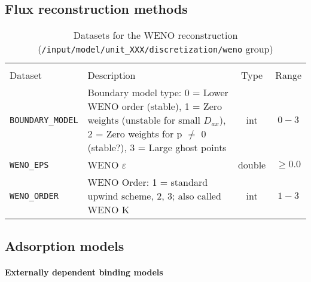 \FloatBarrier
\subsection{Flux reconstruction methods}

\begin{table}[!ht]
\footnotesize
\begin{tabu}to \linewidth[m]{lX[m]cc} \toprule
{} \\
\rowfont[c]\normalfont Dataset & Description & Type & Range \everyrow{\midrule}\\
\texttt{BOUNDARY\_MODEL} & Boundary model type: 0 = Lower WENO order (stable), 1 = Zero weights (unstable for small $D_{ax}$), 2 = Zero weights for p $\neq$ 0 (stable?), 3 = Large ghost points & int & $0-3$\\
\texttt{WENO\_EPS} & WENO $\varepsilon$ & double & $\geq 0.0$\\
\texttt{WENO\_ORDER} & WENO Order: 1 = standard upwind scheme, 2, 3; also called WENO K & int & $1-3$ \everyrow{}\\
\bottomrule
\end{tabu}
\caption[Datasets for the WENO reconstruction]{\label{tab:FFModelUnitOpDiscretizationWeno}Datasets for the WENO reconstruction (\texttt{/input/model/unit\_XXX/discretization/weno} group)}
\end{table}

\FloatBarrier
\subsection{Adsorption models}\label{sec:FFAdsorption}

\paragraph{Externally dependent binding models}

